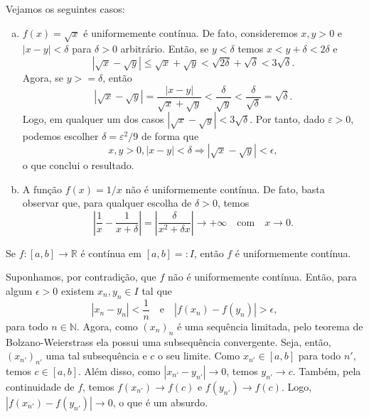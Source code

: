 \begin{ex}
  Vejamos os seguintes casos:
  \begin{enumerate}[a)]
  \item $f(x) = \sqrt{x}$ é uniformemente contínua. De fato, consideremos $x,y>0$ e $|x-y|<\delta$ para $\delta>0$ arbitrário. Então, se $y<\delta$ temos $x < y+\delta < 2\delta$ e
    \begin{equation}
      |\sqrt{x}-\sqrt{y}| \leq \sqrt{x} + \sqrt{y} < \sqrt{2\delta} + \sqrt{\delta} < 3\sqrt{\delta}.
    \end{equation}
Agora, se $y>=\delta$, então
\begin{equation}
  |\sqrt{x}-\sqrt{y}| = \frac{|x-y|}{\sqrt{x}+\sqrt{y}} < \frac{\delta}{\sqrt{y}} < \frac{\delta}{\sqrt{\delta}} = \sqrt{\delta}.
\end{equation}
Logo, em qualquer um dos casos $|\sqrt{x}-\sqrt{y}| < 3\sqrt{\delta}$. Por tanto, dado $\varepsilon > 0$, podemos escolher $\delta = \varepsilon^2/9$ de forma que
\begin{equation}
  x,y>0, |x-y|<\delta \Rightarrow |\sqrt{x}-\sqrt{y}| < \epsilon,
\end{equation}
o que conclui o resultado.
\item A função $f(x) = 1/x$ não é uniformemente contínua. De fato, basta observar que, para qualquer escolha de $\delta>0$, temos
  \begin{equation}
    \left|\frac{1}{x} - \frac{1}{x+\delta}\right| = \left|\frac{\delta}{x^2 + \delta x}\right|\to +\infty\quad\text{com}\quad x\to 0.
  \end{equation}
  \end{enumerate}
\end{ex}

\begin{teo}
  Se $f:[a, b]\to\mathbb{R}$ é contínua em $[a, b]=:I$, então $f$ é uniformemente contínua.
\end{teo}
\begin{dem}
  Suponhamos, por contradição, que $f$ não é uniformemente contínua. Então, para algum $\epsilon>0$ existem $x_n,y_n\in I$ tal que
  \begin{equation}
    |x_n - y_n| < \frac{1}{n}\quad\text{e}\quad|f(x_n)-f(y_n)|>\epsilon,
  \end{equation}
para todo $n\in\mathbb{N}$. Agora, como $(x_n)_n$ é uma sequência limitada, pelo teorema de Bolzano-Weierstrass ela possui uma subsequência convergente. Seja, então, $(x_{n'})_{n'}$ uma tal subsequência e $c$ o seu limite. Como $x_{n'}\in [a, b]$ para todo $n'$, temos $c\in [a, b]$. Além disso, como $|x_{n'}-y_{n'}|\to 0$, temos $y_{n'}\to c$. Também, pela continuidade de $f$, temos $f(x_{n'})\to f(c)$ e $f(y_{n'})\to f(c)$. Logo, $|f(x_{n'})-f(y_{n'})|\to 0$, o que é um absurdo.
\end{dem}

